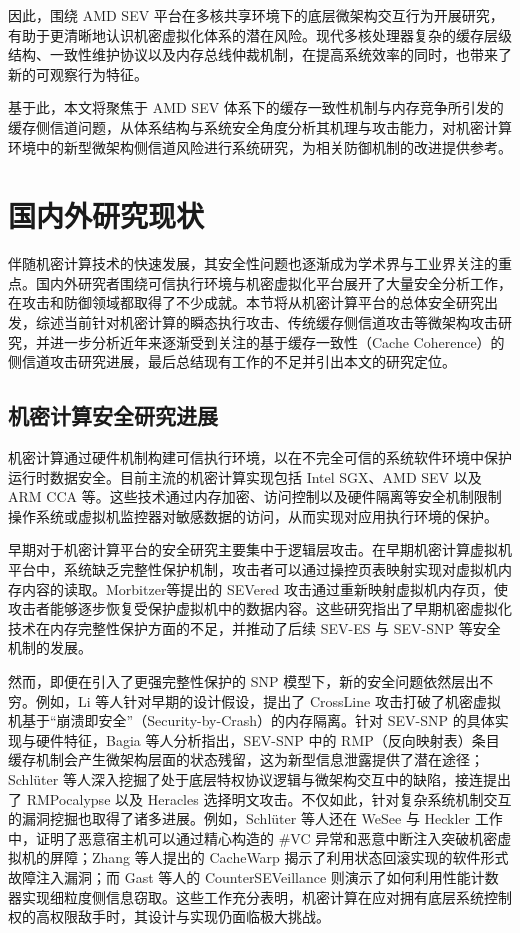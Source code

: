 因此，围绕 AMD SEV 平台在多核共享环境下的底层微架构交互行为开展研究，有助于更清晰地认识机密虚拟化体系的潜在风险。现代多核处理器复杂的缓存层级结构、一致性维护协议以及内存总线仲裁机制，在提高系统效率的同时，也带来了新的可观察行为特征。

基于此，本文将聚焦于 AMD SEV 体系下的缓存一致性机制与内存竞争所引发的缓存侧信道问题，从体系结构与系统安全角度分析其机理与攻击能力，对机密计算环境中的新型微架构侧信道风险进行系统研究，为相关防御机制的改进提供参考。

\section{国内外研究现状}

伴随机密计算技术的快速发展，其安全性问题也逐渐成为学术界与工业界关注的重点。国内外研究者围绕可信执行环境与机密虚拟化平台展开了大量安全分析工作，在攻击和防御领域都取得了不少成就。本节将从机密计算平台的总体安全研究出发，综述当前针对机密计算的瞬态执行攻击、传统缓存侧信道攻击等微架构攻击研究，并进一步分析近年来逐渐受到关注的基于缓存一致性（Cache Coherence）的侧信道攻击研究进展，最后总结现有工作的不足并引出本文的研究定位。

\subsection{机密计算安全研究进展}
机密计算通过硬件机制构建可信执行环境，以在不完全可信的系统软件环境中保护运行时数据安全。目前主流的机密计算实现包括 Intel SGX、AMD SEV 以及 ARM CCA 等\cite{kaplan2016amd,li2022design,costan2016intel}。这些技术通过内存加密、访问控制以及硬件隔离等安全机制限制操作系统或虚拟机监控器对敏感数据的访问，从而实现对应用执行环境的保护。

早期对于机密计算平台的安全研究主要集中于逻辑层攻击。在早期机密计算虚拟机平台中，系统缺乏完整性保护机制，攻击者可以通过操控页表映射实现对虚拟机内存内容的读取。Morbitzer等提出的 SEVered 攻击通过重新映射虚拟机内存页，使攻击者能够逐步恢复受保护虚拟机中的数据内容\cite{morbitzer2018severed}。这些研究指出了早期机密虚拟化技术在内存完整性保护方面的不足，并推动了后续 SEV-ES 与 SEV-SNP 等安全机制的发展。

然而，即便在引入了更强完整性保护的 SNP 模型下，新的安全问题依然层出不穷。例如，Li 等人针对早期的设计假设，提出了 CrossLine 攻击打破了机密虚拟机基于“崩溃即安全”（Security-by-Crash）的内存隔离\cite{li2021crossline}。针对 SEV-SNP 的具体实现与硬件特征，Bagia 等人分析指出，SEV-SNP 中的 RMP（反向映射表）条目缓存机制会产生微架构层面的状态残留，这为新型信息泄露提供了潜在途径\cite{bagia2025close}；Schl{\"u}ter 等人深入挖掘了处于底层特权协议逻辑与微架构交互中的缺陷，接连提出了 RMPocalypse\cite{schlüter2025rmpocalypse} 以及 Heracles\cite{schlüter2025heracles} 选择明文攻击。不仅如此，针对复杂系统机制交互的漏洞挖掘也取得了诸多进展。例如，Schl{\"u}ter 等人还在 WeSee\cite{schluter2024wesee} 与 Heckler\cite{schluter2024heckler} 工作中，证明了恶意宿主机可以通过精心构造的 \#VC 异常和恶意中断注入突破机密虚拟机的屏障；Zhang 等人提出的 CacheWarp\cite{zhang2024cachewarp} 揭示了利用状态回滚实现的软件形式故障注入漏洞；而 Gast 等人的 CounterSEVeillance\cite{gast2025counterseveillance} 则演示了如何利用性能计数器实现细粒度侧信息窃取。这些工作充分表明，机密计算在应对拥有底层系统控制权的高权限敌手时，其设计与实现仍面临极大挑战。

